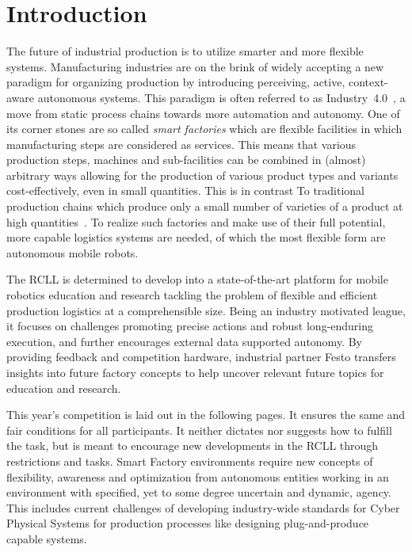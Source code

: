 \documentclass[12pt,twoside]{article}
\begin{document}
\section{Introduction}
\label{sec:intro}
The future of industrial production is to utilize smarter and more flexible
systems. Manufacturing industries are on the brink of
widely accepting a new paradigm for organizing production by introducing
perceiving, active, context-aware autonomous systems. This paradigm is
often referred to as Industry~4.0~\cite{Industry-4.0}, a move from static
process chains towards more automation and autonomy. One of its corner stones
are so called \emph{smart factories} which are flexible facilities in which
manufacturing steps are considered as services. This means that various
production steps, machines and sub-facilities can be combined in (almost)
arbitrary ways allowing for the production of various product types and
variants cost-effectively, even in small quantities. This is in contrast To
traditional production chains which produce only a small number of varieties
of a product at high quantities~\cite{RCLL-CPS}. To realize such factories
and make use of their full potential, more capable logistics systems are needed,
of which the most flexible form are autonomous mobile robots.

The \ac{RCLL} is determined to develop into a
state-of-the-art platform for mobile robotics education and research
tackling the problem of flexible and efficient production logistics at a
comprehensible size. Being an industry motivated league, it focuses
on challenges promoting precise actions and robust long-enduring
execution, and further encourages external data supported
autonomy. By providing feedback and competition hardware, industrial
partner Festo transfers insights into future factory concepts to help
 uncover relevant future topics for education and research.

 This year's competition is laid out in the following pages.  It ensures
 the same and fair conditions for all participants. It neither
 dictates nor suggests how to fulfill the task, but is meant
 to encourage new developments in the \ac{RCLL} through restrictions
 and tasks. Smart Factory environments require new
 concepts of flexibility, awareness and optimization from autonomous
 entities working in an environment with specified, yet to some degree
 uncertain and dynamic, agency. This includes current challenges of
 developing industry-wide standards for Cyber Physical Systems for
 production processes like designing plug-and-produce capable
 systems.
\end{document}

